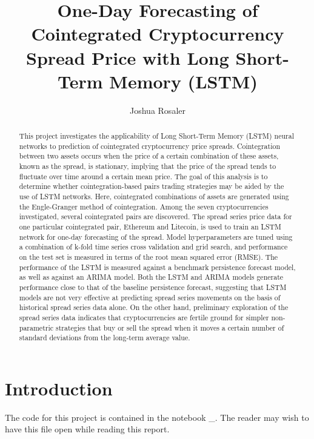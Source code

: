 \documentclass{article}
\begin{document}
\title{One-Day Forecasting of Cointegrated Cryptocurrency Spread Price with Long Short-Term Memory (LSTM)
}
\author{Joshua Rosaler}
\date{}

\maketitle

\begin{abstract}
This project investigates the applicability of Long Short-Term Memory (LSTM) neural networks to prediction of cointegrated cryptocurrency price spreads. Cointegration between two assets occurs when the price of a certain combination of these assets, known as the spread, is stationary, implying that the price of the spread tends to fluctuate over time around a certain mean price. The goal of this analysis is to determine whether cointegration-based pairs trading strategies may be aided by the use of LSTM networks. Here, cointegrated combinations of assets are generated using the Engle-Granger method of cointegration. Among the seven cryptocurrencies investigated, several cointegrated pairs are discovered. The spread series price data for one particular cointegrated pair, Ethereum and Litecoin, is used to train an LSTM network for one-day forecasting of the spread. Model hyperparameters are tuned using a combination of k-fold time series cross validation and grid search, and performance on the test set is measured in terms of the root mean squared error (RMSE). The performance of the LSTM is measured against a benchmark persistence forecast model, as well as against an ARIMA model. Both the LSTM and ARIMA models generate performance close to that of the baseline persistence forecast, suggesting that LSTM models are not very effective at predicting spread series movements on the basis of historical spread series data alone. On the other hand, preliminary exploration of the spread series data indicates that cryptocurrencies are fertile ground for simpler non-parametric strategies that buy or sell the spread when it moves a certain number of standard deviations from the long-term average value. 
\end{abstract}

 

\section{Introduction}

The code for this project is contained in the notebook \_. The reader may wish to have this file open while reading this report. 
\end{document}
